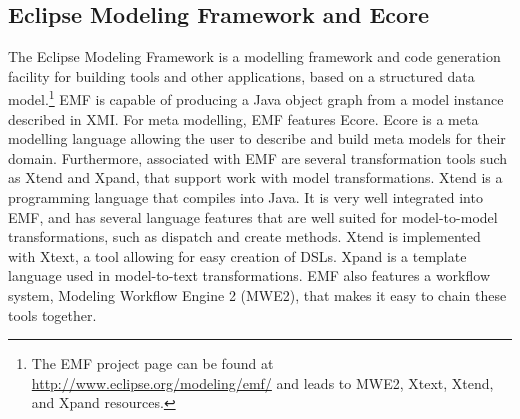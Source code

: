 \subsection{Eclipse Modeling Framework and Ecore}
The Eclipse Modeling Framework is a modelling framework and code generation facility for building tools and other applications, based on a structured data model.\footnote{The EMF project page can be found at \url{http://www.eclipse.org/modeling/emf/} and leads to MWE2, Xtext, Xtend, and Xpand resources.} EMF is capable of producing a Java object graph from a model instance described in XMI. For meta modelling, EMF features Ecore. Ecore is a meta modelling language allowing the user to describe and build meta models for their domain. Furthermore, associated with EMF are several transformation tools such as Xtend and Xpand, that support work with model transformations. Xtend is a programming language that compiles into Java. It is very well integrated into EMF, and has several language features that are well suited for model-to-model transformations, such as dispatch and create methods. Xtend is implemented with Xtext, a tool allowing for easy creation of DSLs. Xpand is a template language used in model-to-text transformations. EMF also features a workflow system, Modeling Workflow Engine 2 (MWE2), that makes it easy to chain these tools together.
